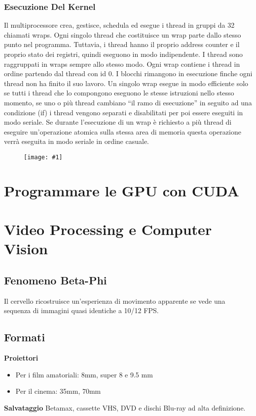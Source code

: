 \documentclass[8pt,a4paper]{article}
\newcommand{\f}[1]{
      \begin{figure}[H]
        \center
      \texttt{[image: \#1]}
      \end{figure}
}
\begin{document}
\begin{multicols}{5}
    \subsubsection{Esecuzione Del Kernel}
    Il multiprocessore crea, gestisce, schedula ed esegue i thread in gruppi da 
    32 chiamati wraps. Ogni singolo thread che costituisce un wrap parte dallo 
    stesso punto nel programma. Tuttavia, i thread hanno il proprio address counter 
    e il proprio stato dei registri, quindi eseguono in modo indipendente. I thread 
    sono raggruppati in wraps sempre allo stesso modo. Ogni wrap contiene i thread in 
    ordine partendo dal thread con id 0. I blocchi rimangono in esecuzione finche ogni 
    thread non ha finito il suo lavoro. Un singolo wrap esegue in modo efficiente solo 
    se tutti i thread che lo compongono eseguono le stesse istruzioni nello stesso 
    momento, se uno o più thread cambiano “il ramo di esecuzione” in seguito ad una 
    condizione (if) i thread vengono separati e disabilitati per poi essere eseguiti 
    in modo seriale. Se durante l’esecuzione di un wrap è richiesto a più thread di 
    eseguire un’operazione atomica sulla stessa area di memoria questa operazione 
    verrà eseguita in modo seriale in ordine casuale.
    \f{kernel-exec}
    \section{Programmare le GPU con CUDA}

    \section{Video Processing e Computer Vision}
    \subsection{Fenomeno Beta-Phi}
    Il cervello ricostruisce un'esperienza di movimento apparente se vede una 
    sequenza di immagini quasi identiche a 10/12 FPS.
    \subsection{Formati}
      \textbf{Proiettori}
      \begin{itemize}
        \item Per i film amatoriali: 8mm, super 8 e 9.5 mm
        \item Per il cinema: 35mm, 70mm
      \end{itemize}
      \textbf{Salvataggio}
      Betamax, cassette VHS, DVD e dischi Blu-ray ad alta definizione.

\end{multicols}
\end{document}
